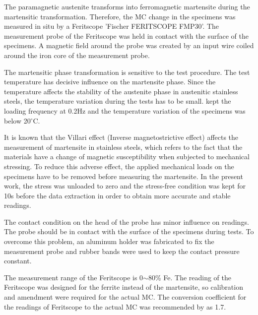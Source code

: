 \documentclass[final,5p,times,onecolumn,10pt,sort&compress]{elsarticle}
\newcommand{\degreeC}{{$^\circ$C}}
\begin{document}
The paramagnetic austenite  transforms into ferromagnetic martensite during the martensitic transformation. Therefore, the MC change in the specimens was measured in situ by a Feritscope 'Fischer FERITSCOPE FMP30'. The measurement probe of the Feritscope was held in contact with the surface of the specimens. A magnetic field around the probe was created by an input wire coiled around the iron core of the measurement probe.

The martensitic phase transformation is sensitive to the test procedure. The test temperature has decisive influence on the martensite phase. Since the temperature affects the stability of the austenite phase in austenitic stainless steels, the temperature variation during the tests has to be small. \cite{Smaga2008Deformation} kept the loading frequency at 0.2Hz and the temperature variation of the specimens was below 20\degreeC.

It is known that the Villari effect  (Inverse magnetostrictive effect)  affects the measurement of martensite in stainless steels, which refers to the fact that the materials have a change of magnetic susceptibility when subjected to mechanical stressing. To reduce this adverse effect, the applied mechanical loads on the specimens have to be removed before  measuring the martensite. In the present work, the stress was unloaded to zero and the stress-free condition was kept for 10s before the data extraction in order to obtain more accurate and stable readings.

The contact condition on the head of the probe has minor influence on readings. The probe should be in contact with the surface of the specimens during tests. To overcome this problem, an aluminum holder was fabricated to fix the measurement probe and rubber bands were used to keep the contact pressure constant.

The measurement range of the Feritscope is 0$\sim$80\% Fe. The reading of the Feritscope was designed for the ferrite instead of the martensite, so calibration and amendment were required for the actual MC. The conversion coefficient for the readings of Feritscope to the actual MC was recommended  by \cite {Talonen2004} as 1.7.

\end{document}
